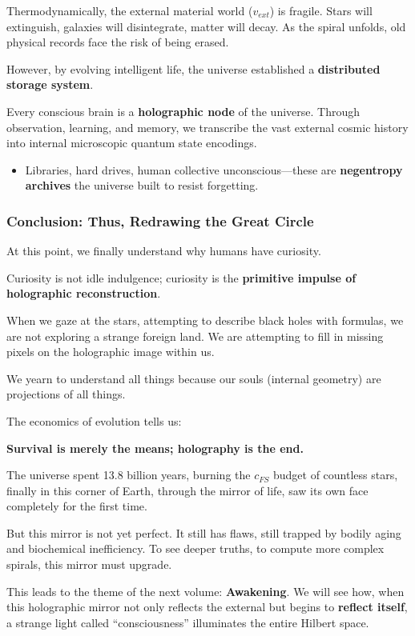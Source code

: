 Thermodynamically, the external material world ($v_{ext}$) is fragile. Stars will extinguish, galaxies will disintegrate, matter will decay. As the spiral unfolds, old physical records face the risk of being erased.

However, by evolving intelligent life, the universe established a \textbf{distributed storage system}.

Every conscious brain is a \textbf{holographic node} of the universe. Through observation, learning, and memory, we transcribe the vast external cosmic history into internal microscopic quantum state encodings.

\begin{itemize}
\item Libraries, hard drives, human collective unconscious---these are \textbf{negentropy archives} the universe built to resist forgetting.
\end{itemize}

\subsubsection{Conclusion: Thus, Redrawing the Great Circle}

At this point, we finally understand why humans have curiosity.

Curiosity is not idle indulgence; curiosity is the \textbf{primitive impulse of holographic reconstruction}.

When we gaze at the stars, attempting to describe black holes with formulas, we are not exploring a strange foreign land. We are attempting to fill in missing pixels on the holographic image within us.

We yearn to understand all things because our souls (internal geometry) are projections of all things.

The economics of evolution tells us:

\textbf{Survival is merely the means; holography is the end.}

The universe spent 13.8 billion years, burning the $c_{FS}$ budget of countless stars, finally in this corner of Earth, through the mirror of life, saw its own face completely for the first time.

But this mirror is not yet perfect. It still has flaws, still trapped by bodily aging and biochemical inefficiency. To see deeper truths, to compute more complex spirals, this mirror must upgrade.

This leads to the theme of the next volume: \textbf{Awakening}. We will see how, when this holographic mirror not only reflects the external but begins to \textbf{reflect itself}, a strange light called ``consciousness'' illuminates the entire Hilbert space.

